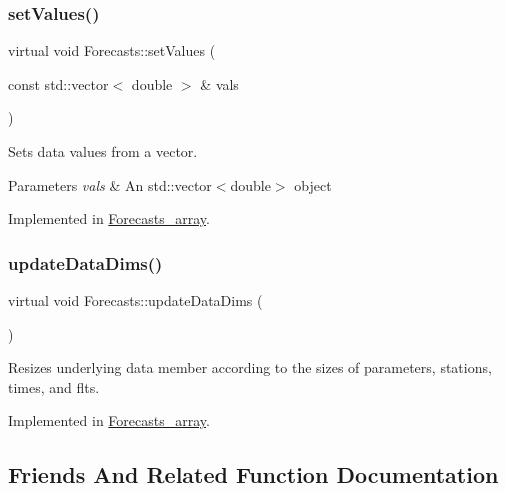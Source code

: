 \mbox{\label{class_forecasts_ae2a59385e03dd372fef3dfe89f5a31cf}} 
\subsubsection{\texorpdfstring{set\+Values()}{setValues()}}
{\footnotesize\ttfamily virtual void Forecasts\+::set\+Values (\begin{DoxyParamCaption}\item[{const std\+::vector$<$ double $>$ \&}]{vals }\end{DoxyParamCaption})\hspace{0.3cm}{\ttfamily [pure virtual]}}

Sets data values from a vector.


\begin{DoxyParams}{Parameters}
{\em vals} & An std\+::vector$<$double$>$ object \\
\hline
\end{DoxyParams}


Implemented in \mbox{\hyperlink{class_forecasts__array_af31e7741f2e048593cbec1c317210b65}{Forecasts\+\_\+array}}.

\mbox{\label{class_forecasts_a8c7d29af8edb5c3bc6a6aad2220506a9}} 
\subsubsection{\texorpdfstring{update\+Data\+Dims()}{updateDataDims()}}
{\footnotesize\ttfamily virtual void Forecasts\+::update\+Data\+Dims (\begin{DoxyParamCaption}{ }\end{DoxyParamCaption})\hspace{0.3cm}{\ttfamily [pure virtual]}}

Resizes underlying data member according to the sizes of parameters, stations, times, and flts. 

Implemented in \mbox{\hyperlink{class_forecasts__array_ab3fc780bb6a5cbf132457c8c336bc777}{Forecasts\+\_\+array}}.



\subsection{Friends And Related Function Documentation}
\mbox{\label{class_forecasts_a42c14120042eae287169092654f5b6c8}} 
